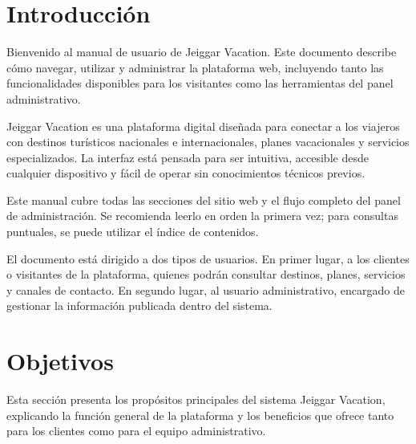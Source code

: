 \documentclass[12pt,letterpaper]{article}
\begin{document}
\newpage
\tableofcontents

\newpage
{}
\listoftables

\newpage
{}
\listoffigures

\clearpage
\section*{Introducción}

Bienvenido al manual de usuario de Jeiggar Vacation. Este documento describe cómo navegar, utilizar y administrar la plataforma web, incluyendo tanto las funcionalidades disponibles para los visitantes como las herramientas del panel administrativo.

Jeiggar Vacation es una plataforma digital diseñada para conectar a los viajeros con destinos turísticos nacionales e internacionales, planes vacacionales y servicios especializados. La interfaz está pensada para ser intuitiva, accesible desde cualquier dispositivo y fácil de operar sin conocimientos técnicos previos.

Este manual cubre todas las secciones del sitio web y el flujo completo del panel de administración. Se recomienda leerlo en orden la primera vez; para consultas puntuales, se puede utilizar el índice de contenidos.

El documento está dirigido a dos tipos de usuarios. En primer lugar, a los clientes o visitantes de la plataforma, quienes podrán consultar destinos, planes, servicios y canales de contacto. En segundo lugar, al usuario administrativo, encargado de gestionar la información publicada dentro del sistema.

\section{Objetivos}

Esta sección presenta los propósitos principales del sistema Jeiggar Vacation, explicando la función general de la plataforma y los beneficios que ofrece tanto para los clientes como para el equipo administrativo.
\end{document}
